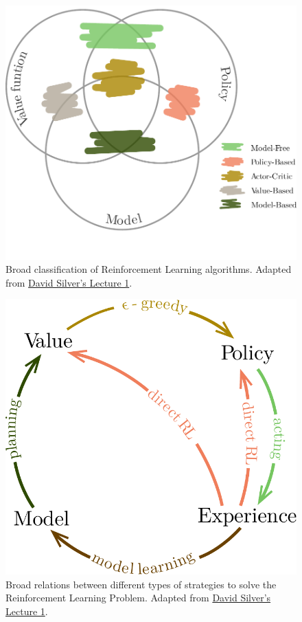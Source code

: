 \documentclass[
  12pt,
  openany]{book}
\begin{document}
\begin{figure}

{\centering \includegraphics[width=0.8\linewidth]{pics/rl_families} 

}

\caption{Broad classification of Reinforcement Learning algorithms. Adapted from \href{https://www.youtube.com/watch?v=2pWv7GOvuf0\&t=1163s}{David Silver's Lecture 1}.}\label{fig:rl-algorithm-type}
\end{figure}



\begin{figure}

{\centering \includegraphics[width=0.8\linewidth]{pics/rl_families_relations} 

}

\caption{Broad relations between different types of strategies to solve the Reinforcement Learning Problem. Adapted from \href{https://www.youtube.com/watch?v=2pWv7GOvuf0\&t=1163s}{David Silver's Lecture 1}.}\label{fig:rl-relations}
\end{figure}
\end{document}
